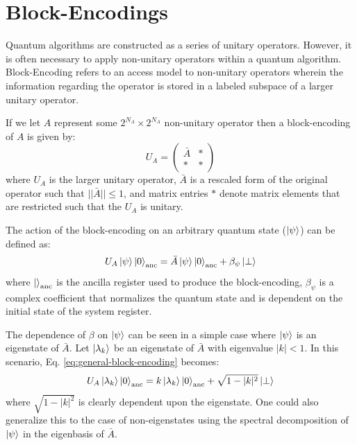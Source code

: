 \section{Block-Encodings}
\label{sec:block-encoding}

Quantum algorithms are constructed as a series of unitary operators.
However, it is often necessary to apply non-unitary operators within a quantum algorithm.
Block-Encoding refers to an access model to non-unitary operators wherein the information regarding the operator is stored in a labeled subspace of a larger unitary operator.

If we let $A$ represent some $2^{N_A}\times2^{N_A}$ non-unitary operator then a block-encoding of $A$ is given by:
\begin{equation}
    U_A = 
    \begin{pmatrix}
    \bar{A} & * \\
    * & * 
    \end{pmatrix}
\end{equation}
where $U_A$ is the larger unitary operator, $\bar{A}$ is a rescaled form of the original operator such that $||\bar{A}|| \leq 1$, and matrix entries $*$ denote matrix elements that are restricted such that the $U_A$ is unitary.

The action of the block-encoding on an arbitrary quantum state ($\ket{\psi}$) can be defined as:
\begin{equation}
    \label{eq:general-block-encoding}
    U_A \ket{\psi} \ket{0}_{\text{anc}} = \bar{A} \ket{\psi} \ket{0}_{\text{anc}} + \beta_\psi \ket{\perp}
\end{equation}
where $\ket{}_{\text{anc}}$ is the ancilla register used to produce the block-encoding, $\beta_\psi$ is a complex coefficient that normalizes the quantum state and is dependent on the initial state of the system register.

The dependence of $\beta$ on $\ket{\psi}$ can be seen in a simple case where $\ket{\psi}$ is an eigenstate of $\bar{A}$.
Let $\ket{\lambda_k}$ be an eigenstate of $\bar{A}$ with eigenvalue $|k| < 1$.
In this scenario, Eq. \ref{eq:general-block-encoding} becomes:
\begin{equation}
    U_A \ket{\lambda_k} \ket{0}_{\text{anc}} = k \ket{\lambda_k} \ket{0}_{\text{anc}} + \sqrt{1 - |k|^2} \ket{\perp}
\end{equation}
where $\sqrt{1 - |k|^2}$ is clearly dependent upon the eigenstate.
One could also generalize this to the case of non-eigenstates using the spectral decomposition of $\ket{\psi}$ in the eigenbasis of $\bar{A}$.

